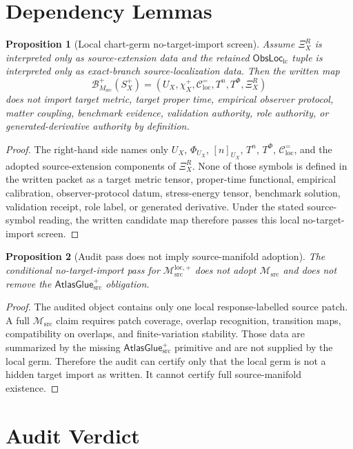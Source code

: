 \documentclass[11pt]{article}
\newcommand{\ObsLocLC}{\mathsf{ObsLoc}_{\mathrm{lc}}}
\newcommand{\Msrc}{\mathcal{M}_{\mathrm{src}}}
\newcommand{\Mloc}{\mathcal{M}_{\mathrm{src}}^{\mathrm{loc},+}}
\newcommand{\XiR}{\Xi_X^R}
\newcommand{\Splus}{S_X^+}
\newcommand{\PhiU}{\Phi_{U_X}}
\newcommand{\Cexact}{\mathcal{C}^{=}_{\mathrm{loc}}}
\newcommand{\BMsrc}{\mathcal{B}^{+}_{M_{\mathrm{src}}}}
\newcommand{\AtlasGlue}{\mathsf{AtlasGlue}_{\mathrm{src}}^{+}}
\newtheorem{proposition}{Proposition}
\begin{document}
\section{Dependency Lemmas}

\begin{proposition}[Local chart-germ no-target-import screen]
Assume \(\XiR\) is interpreted only as source-extension data and the retained
\(\ObsLocLC\) tuple is interpreted only as exact-branch source-localization
data. Then the written map
\[
  \BMsrc(\Splus)=
  (U_X,\chi_X^+,\Cexact,T^n,T^\Phi,\XiR)
\]
does not import target metric, target proper time, empirical observer protocol,
matter coupling, benchmark evidence, validation authority, role authority, or
generated-derivative authority by definition.
\end{proposition}

\begin{proof}
The right-hand side names only \(U_X\), \(\PhiU\), \([n]_{U_X}\),
\(T^n\), \(T^\Phi\), \(\Cexact\), and the adopted source-extension components
of \(\XiR\). None of those symbols is defined in the written packet as a
target metric tensor, proper-time functional, empirical calibration,
observer-protocol datum, stress-energy tensor, benchmark solution, validation
receipt, role label, or generated derivative. Under the stated source-symbol
reading, the written candidate map therefore passes this local no-target-import
screen.
\end{proof}

\begin{proposition}[Audit pass does not imply source-manifold adoption]
The conditional no-target-import pass for \(\Mloc\) does not adopt \(\Msrc\)
and does not remove the \(\AtlasGlue\) obligation.
\end{proposition}

\begin{proof}
The audited object contains only one local response-labelled source patch. A
full \(\Msrc\) claim requires patch coverage, overlap recognition, transition
maps, compatibility on overlaps, and finite-variation stability. Those data are
summarized by the missing \(\AtlasGlue\) primitive and are not supplied by the
local germ. Therefore the audit can certify only that the local germ is not a
hidden target import as written. It cannot certify full source-manifold
existence.
\end{proof}

\section{Audit Verdict}
\end{document}
